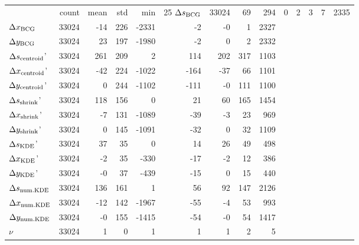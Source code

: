 \begin{tabular}{lrrrrrrrr}
\toprule
{} &  count &  mean &  std &   min &  25%
\midrule
$\Delta s_{\rm BCG}$       &  33024 &    69 &  294 &     0 &    2 &    3 &    7 & 2335 \\
$\Delta x_{\rm BCG}$       &  33024 &   -14 &  226 & -2331 &   -2 &   -0 &    1 & 2327 \\
$\Delta y_{\rm BCG}$       &  33024 &    23 &  197 & -1980 &   -2 &    0 &    2 & 2332 \\
$\Delta s_{\rm centroid}$' &  33024 &   261 &  209 &     2 &  114 &  202 &  317 & 1103 \\
$\Delta x_{\rm centroid}$' &  33024 &   -42 &  224 & -1022 & -164 &  -37 &   66 & 1101 \\
$\Delta y_{\rm centroid}$' &  33024 &     0 &  244 & -1102 & -111 &   -0 &  111 & 1100 \\
$\Delta s_{\rm shrink}$'   &  33024 &   118 &  156 &     0 &   21 &   60 &  165 & 1454 \\
$\Delta x_{\rm shrink}$'   &  33024 &    -7 &  131 & -1089 &  -39 &   -3 &   23 &  969 \\
$\Delta y_{\rm shrink}$'   &  33024 &     0 &  145 & -1091 &  -32 &    0 &   32 & 1109 \\
$\Delta s_{\rm KDE}$'      &  33024 &    37 &   35 &     0 &   14 &   26 &   49 &  498 \\
$\Delta x_{\rm KDE}$'      &  33024 &    -2 &   35 &  -330 &  -17 &   -2 &   12 &  386 \\
$\Delta y_{\rm KDE}$'      &  33024 &    -0 &   37 &  -439 &  -15 &    0 &   15 &  440 \\
$\Delta s_{\rm num. KDE}$  &  33024 &   136 &  161 &     1 &   56 &   92 &  147 & 2126 \\
$\Delta x_{\rm num. KDE}$  &  33024 &   -12 &  142 & -1967 &  -55 &   -4 &   53 &  993 \\
$\Delta y_{\rm num. KDE}$  &  33024 &    -0 &  155 & -1415 &  -54 &   -0 &   54 & 1417 \\
$\nu$                      &  33024 &     1 &    0 &     1 &    1 &    1 &    2 &    5 \\
\bottomrule
\end{tabular}
